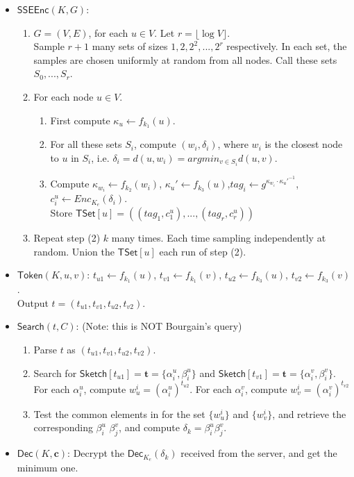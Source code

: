 \documentclass[12pt]{article}
\newcommand{\class}[1]{{\ensuremath{\mathsf{#1}}}}
\newcommand{\dec}{\ensuremath{\class{Dec}}\xspace}
\newcommand{\vect}[1]{\ensuremath{\textbf{#1}}}
\newcommand{\vc}{\vect{c}}
\newcommand{\vt}{\vect{t}}
\newcommand{\search}{\class{Search}}
\newcommand{\token}{\class{Token}}
\newcommand{\SSEEnc}{\class{SSEEnc}}
\newcommand{\Tset}{\class{TSet}}
\newcommand{\sketch}{\ensuremath{\class{Sketch}}\xspace}
\begin{document}
\begin{itemize}
\item $\SSEEnc(K, G)$:
\begin{enumerate}
\item $G = (V, E)$, for each $u \in V$. Let $r = \lfloor \log V\rfloor$.\\
Sample $r + 1$ many sets of sizes $1, 2, 2^2, ..., 2^r$ respectively. In each set, the samples are chosen uniformly at random from all nodes. Call these sets $S_0, ..., S_r$. 
\item For each node $u\in V$. 
\begin{enumerate}
\item First compute $\kappa_u \leftarrow f_{k_1}(u)$.
\item For all these sets $S_i$, compute $(w_i, \delta_i)$, where $w_i$ is the closest node to $u$ in $S_i$, i.e. $\delta_i = d(u, w_i) = argmin_{v\in S_i}d(u, v)$.
\item Compute $\kappa_{w_i} \leftarrow f_{k_2}(w_i)$, $\kappa_{u}' \leftarrow f_{k_3}(u)$,$tag_i \leftarrow g^{\kappa_{w_i} \cdot \kappa_u'^{-1}}$, $c^u_i \leftarrow Enc_{K_e}(\delta_i)$. \\
Store $\Tset[u] = ((tag_1, c^u_1), ..., (tag_r, c^u_r))$
\end{enumerate}
\item Repeat step (2) $k$ many times. Each time sampling independently at random. Union the $\Tset[u]$ each run of step (2).
\end{enumerate}

\item $\token(K, u, v)$: $t_{u1} \leftarrow f_{k_1}(u)$, $t_{v1} \leftarrow f_{k_1}(v)$, $t_{u2} \leftarrow f_{k_3}(u)$, $t_{v2} \leftarrow f_{k_3}(v)$.\\
Output $t = (t_{u1}, t_{v1}, t_{u2}, t_{v2})$.\\


\item $\search(t, C)$: (Note: this is NOT Bourgain's query)
\begin{enumerate}
\item Parse $t$ as $(t_{u1}, t_{v1}, t_{u2}, t_{v2})$.
\item Search for $\sketch[t_{u1}] = \vt = \{\alpha^u_i, \beta^u_i\}$ and $\sketch[t_{v1}] = \vt = \{\alpha^v_i, \beta^v_i\}$.\\
For each $\alpha_i^u$, compute $w_u^i = (\alpha_i^u)^{t_{u2}}$. For each $\alpha_i^v$, compute $w_v^i = (\alpha_i^v)^{t_{v2}}$
\item Test the common elements in for the set $\{w_u^i\}$ and $\{w_v^i\}$, and retrieve the corresponding $\beta^u_i$ $\beta^v_j$, and compute  $\delta_k = \beta^u_i \beta^v_j$. 
\end{enumerate}

\item $\dec(K, \vc)$: Decrypt the $\dec_{K_e}(\delta_k)$ received from the server, and get the minimum one.
\end{itemize}
\end{document}
